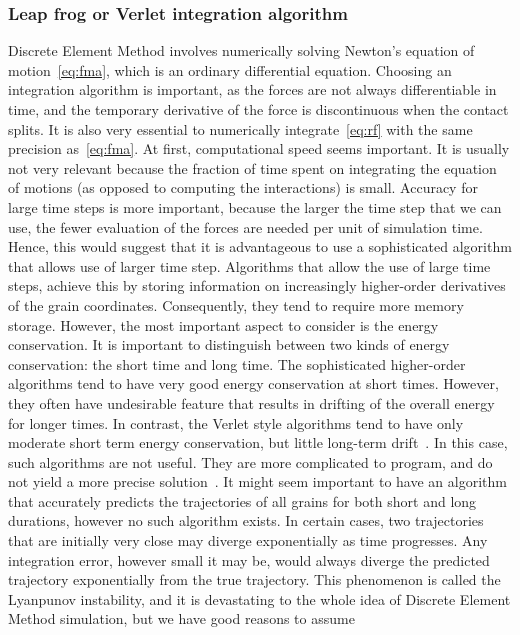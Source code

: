 \subsubsection{Leap frog or Verlet integration algorithm}
Discrete Element Method involves numerically solving Newton's equation of 
motion~\cref{eq:fma}, 
which 
is an ordinary differential equation. Choosing an integration algorithm is 
important, as the 
forces 
are not always differentiable in time, and the temporary derivative of the 
force is discontinuous 
when the contact splits. It is also very essential to numerically 
integrate~\cref{eq:rf} with 
the same precision as~\cref{eq:fma}. At first, computational speed seems 
important. It is 
usually not very relevant because the fraction of time spent on integrating 
the equation of 
motions 
(as opposed to computing the interactions) is small. Accuracy for large time 
steps is more 
important, because the larger the time step that we can use, the fewer 
evaluation of the forces 
are 
needed per unit of simulation time. Hence, this would suggest that it is 
advantageous to use a 
sophisticated algorithm that allows use of larger time step. Algorithms that 
allow the use of 
large 
time steps, achieve this by storing information on increasingly higher-order 
derivatives of the 
grain coordinates. Consequently, they tend to require more memory storage. 
However, the most 
important aspect to consider is the energy conservation. It is important to 
distinguish between 
two 
kinds of energy conservation: the short time and long time. The sophisticated 
higher-order 
algorithms tend to have very good energy conservation at short times. However, 
they often have 
undesirable feature that results in drifting of the overall energy for longer 
times. In contrast, 
the Verlet style algorithms tend to have only moderate short term energy 
conservation, but little 
long-term drift~\citep{Daan1996}. In this case, such algorithms are not 
useful. They are more 
complicated to program, and do not yield a more precise 
solution~\citep{Sean2011}. It might seem 
important to have an algorithm that accurately predicts the trajectories of 
all grains for both 
short and long durations, however no such algorithm exists. In certain cases, 
two trajectories 
that 
are initially very close may diverge exponentially as time progresses. Any 
integration error, 
however small it may be, would always diverge the predicted trajectory 
exponentially from the true 
trajectory. This phenomenon is called the Lyanpunov instability, and it is 
devastating to the 
whole 
idea of Discrete Element Method simulation, but we have good reasons to assume 
